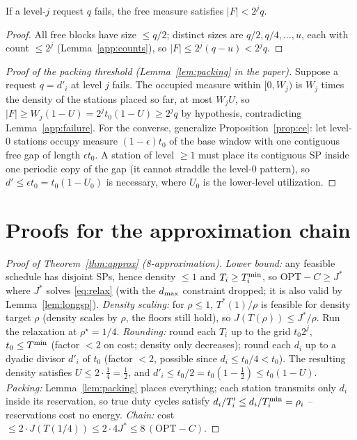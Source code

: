 \begin{lemma}
\label{app:failure}
If a level-$j$ request $q$ fails, the free measure satisfies
$|F| < 2^j q$.
\end{lemma}

\begin{proof}
All free blocks have size $\le q/2$; distinct sizes are
$q/2, q/4, \dots, u$, each with count $\le 2^j$
(Lemma~\ref{app:counts}), so $|F| \le 2^j (q - u) < 2^j q$.
\end{proof}

\begin{proof}[Proof of the packing threshold (Lemma~\ref{lem:packing} in the paper)]
Suppose a request $q = d'_i$ at level $j$ fails. The occupied measure
within $[0, W_j)$ is $W_j$ times the density of the stations placed so
far, at most $W_j U$, so $|F| \ge W_j (1 - U) = 2^j t_0 (1 - U) \ge 2^j q$
by hypothesis, contradicting Lemma~\ref{app:failure}. For the converse,
generalize Proposition~\ref{prop:ce}: let level-$0$ stations occupy measure
$(1-\epsilon) t_0$ of the base window with one contiguous free gap of
length $\epsilon t_0$. A station of level $\ge 1$ must place its
contiguous SP inside one periodic copy of the gap (it cannot straddle the
level-$0$ pattern), so $d' \le \epsilon t_0 = t_0 (1 - U_0)$ is necessary,
where $U_0$ is the lower-level utilization.
\end{proof}

\section{Proofs for the approximation chain}

\begin{proof}[Proof of Theorem~\ref{thm:approx} (8-approximation)]
\emph{Lower bound:} any feasible schedule has disjoint SPs, hence density
$\le 1$ and $T_i \ge T^{\min}_i$, so $\mathrm{OPT} - C \ge J^*$ where $J^*$
solves \eqref{eq:relax} (with the $d_{\max}$ constraint dropped; it is also
valid by Lemma~\ref{lem:longsp}). \emph{Density scaling:} for $\rho \le 1$,
$T^*(1)/\rho$ is feasible for density target $\rho$ (density scales by
$\rho$, the floors still hold), so $J(T(\rho)) \le J^*/\rho$. Run the
relaxation at $\rho^\star = 1/4$. \emph{Rounding:} round each $T_i$ up to
the grid $t_0 2^j$, $t_0 \le T^{\min}$ (factor $< 2$ on cost; density only
decreases); round each $d_i$ up to a dyadic divisor $d'_i$ of $t_0$
(factor $< 2$, possible since $d_i \le t_0/4 < t_0$). The resulting
density satisfies $U \le 2 \cdot \tfrac14 = \tfrac12$, and
$d'_i \le t_0/2 = t_0(1 - \tfrac12) \le t_0 (1 - U)$. \emph{Packing:}
Lemma~\ref{lem:packing} places everything; each station transmits only $d_i$ inside its
reservation, so true duty cycles satisfy
$d_i / T'_i \le d_i / T^{\min}_i = \rho_i$ -- reservations cost no energy.
\emph{Chain:} cost $\le 2 \cdot J(T(1/4)) \le 2 \cdot 4 J^* \le
8\,(\mathrm{OPT} - C)$.
\end{proof}

